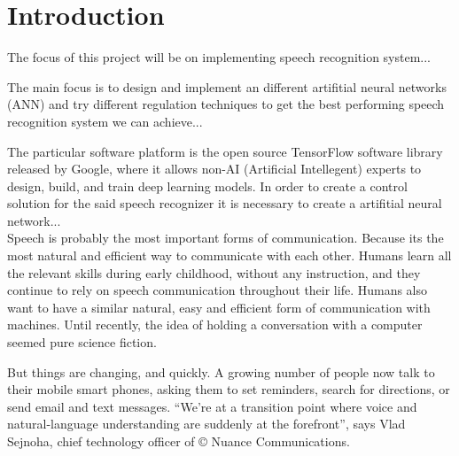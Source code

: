 \chapter{Introduction}\label{ch:introduction}

The focus of this project will be on implementing speech recognition system...

The main focus is to design and implement an different artifitial neural networks (ANN) and try different regulation techniques to get the best performing speech recognition system we can achieve...

The particular software platform is the open source TensorFlow \cite{tensorflow2015-whitepaper} software library released by Google, where it allows non-AI (Artificial Intellegent) experts to design, build, and train deep learning models. In order to create a control solution for the said speech recognizer it is necessary to create a artifitial neural network...\\

Speech is probably the most important forms of communication. Because its the most natural and efficient way to communicate with each other. Humans learn all the relevant skills during early childhood, without any instruction, and they continue to rely on speech communication throughout their life. Humans also want to have a similar natural, easy and efficient form of communication with machines. Until recently, the idea of holding a conversation with a computer seemed pure science fiction.

But things are changing, and quickly. A growing number of people now talk to their mobile smart phones, asking them to set reminders, search for directions, or send email and text messages. “We’re at a transition point where voice and natural-language understanding are suddenly at the forefront”, says Vlad Sejnoha, chief technology officer of © Nuance Communications.





\cite{kamblespeech}
 






